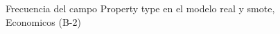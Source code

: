 \begin{figure}[H]
    \centering
    
    \caption{Frecuencia del campo Property type en el modelo real y smote, Economicos (B-2)}
    \label{frecuency-Property Type-smote-enc}
\end{figure}